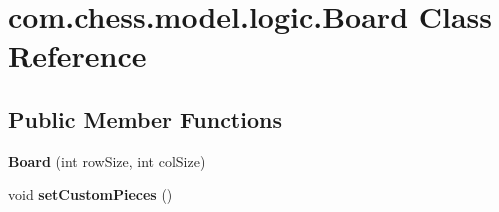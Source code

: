 \hypertarget{classcom_1_1chess_1_1model_1_1logic_1_1_board}{}\section{com.\+chess.\+model.\+logic.\+Board Class Reference}
\label{classcom_1_1chess_1_1model_1_1logic_1_1_board}
\subsection*{Public Member Functions}
\begin{DoxyCompactItemize}
\item 
\mbox{\label{classcom_1_1chess_1_1model_1_1logic_1_1_board_a17387736d76228b5ebcc03810fbef353}} 
{\bfseries Board} (int row\+Size, int col\+Size)
\item 
\mbox{\label{classcom_1_1chess_1_1model_1_1logic_1_1_board_af14cb06e30bab2a01fa9d0144faa3624}} 
void {\bfseries set\+Custom\+Pieces} ()
\end{DoxyCompactItemize}
